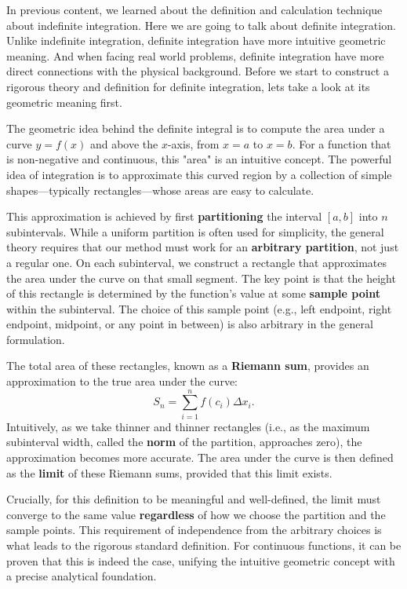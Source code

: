 In previous content, we learned about the definition and calculation technique about indefinite integration. Here we are going to talk about definite integration. Unlike indefinite integration, definite integration have more intuitive geometric meaning. And when facing real world problems, definite integration have more direct connections with the physical background. Before we start to construct a rigorous theory and definition for definite integration, lets take a look at its geometric meaning first.

The geometric idea behind the definite integral is to compute the area under a curve \( y = f(x) \) and above the \( x \)-axis, from \( x = a \) to \( x = b \). For a function that is non-negative and continuous, this "area" is an intuitive concept. The powerful idea of integration is to approximate this curved region by a collection of simple shapes—typically rectangles—whose areas are easy to calculate.

This approximation is achieved by first \textbf{partitioning} the interval \([a, b]\) into \( n \) subintervals. While a uniform partition is often used for simplicity, the general theory requires that our method must work for an \textbf{arbitrary partition}, not just a regular one. On each subinterval, we construct a rectangle that approximates the area under the curve on that small segment. The key point is that the height of this rectangle is determined by the function's value at some \textbf{sample point} within the subinterval. The choice of this sample point (e.g., left endpoint, right endpoint, midpoint, or any point in between) is also arbitrary in the general formulation.

The total area of these rectangles, known as a \textbf{Riemann sum}, provides an approximation to the true area under the curve:
\[
S_n = \sum_{i=1}^n f(c_i) \Delta x_i.
\]
Intuitively, as we take thinner and thinner rectangles (i.e., as the maximum subinterval width, called the \textbf{norm} of the partition, approaches zero), the approximation becomes more accurate. The area under the curve is then defined as the \textbf{limit} of these Riemann sums, provided that this limit exists.

Crucially, for this definition to be meaningful and well-defined, the limit must converge to the same value \textbf{regardless} of how we choose the partition and the sample points. This requirement of independence from the arbitrary choices is what leads to the rigorous standard definition. For continuous functions, it can be proven that this is indeed the case, unifying the intuitive geometric concept with a precise analytical foundation.


